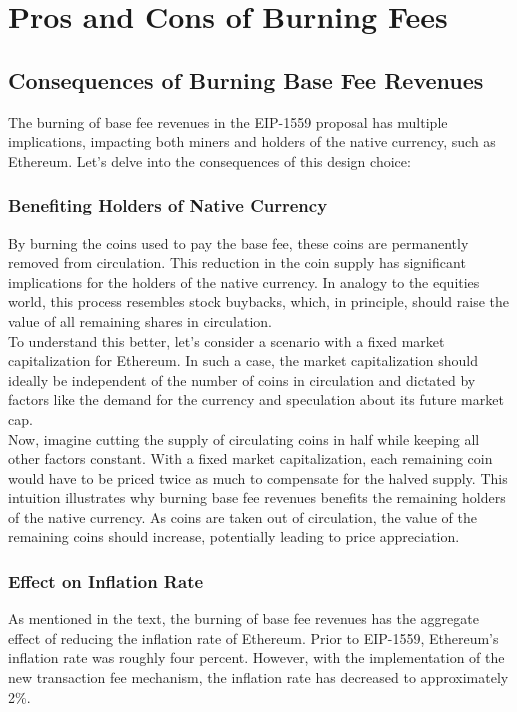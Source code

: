 \section{Pros and Cons of Burning Fees}
\subsection{Consequences of Burning Base Fee Revenues}
The burning of base fee revenues in the EIP-1559 proposal has multiple implications, impacting both miners and holders of the native currency, such as Ethereum. Let's delve into the consequences of this design choice:

\subsubsection{Benefiting Holders of Native Currency}
By burning the coins used to pay the base fee, these coins are permanently removed from circulation. This reduction in the coin supply has significant implications for the holders of the native currency. In analogy to the equities world, this process resembles stock buybacks, which, in principle, should raise the value of all remaining shares in circulation.\\

To understand this better, let's consider a scenario with a fixed market capitalization for Ethereum. In such a case, the market capitalization should ideally be independent of the number of coins in circulation and dictated by factors like the demand for the currency and speculation about its future market cap.\\

Now, imagine cutting the supply of circulating coins in half while keeping all other factors constant. With a fixed market capitalization, each remaining coin would have to be priced twice as much to compensate for the halved supply. This intuition illustrates why burning base fee revenues benefits the remaining holders of the native currency. As coins are taken out of circulation, the value of the remaining coins should increase, potentially leading to price appreciation.

\subsubsection{Effect on Inflation Rate}
As mentioned in the text, the burning of base fee revenues has the aggregate effect of reducing the inflation rate of Ethereum. Prior to EIP-1559, Ethereum's inflation rate was roughly four percent. However, with the implementation of the new transaction fee mechanism, the inflation rate has decreased to approximately 2\%.\\

